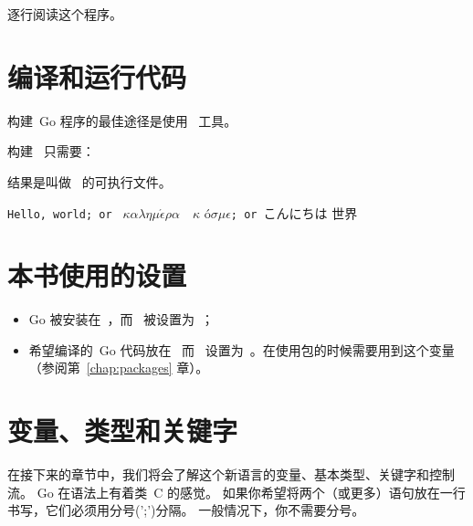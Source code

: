 
逐行阅读这个程序。
\showremarks

\section{编译和运行代码}
\label{sec:building a program}
构建~Go 程序的最佳途径是使用~ 工具。

构建~ 只需要：
\begin{display}
\pr {}
\end{display}
结果是叫做~ 的可执行文件。

\begin{display}
\pr {}
\end{display}
\vspace{-3.0ex}
\texttt{Hello, world; or }%
\begin{math}\kappa\alpha\lambda\eta\mu\acute{\epsilon}\rho\alpha\hspace{1em}\kappa\end{math}%
\'o\begin{math} \sigma\mu\epsilon\end{math}\texttt{; or }こんにちは 世界
\ \newline
\ \newline

\section{本书使用的设置}
\label{sec:settings_used}
\begin{itemize}                            
\item Go 被安装在~，而~ 被设置为~；
\item 希望编译的~Go 代码放在~ 
而~ 设置为~。在使用包的时候需要用到这个变量（参阅第~\ref{chap:packages} 章）。
\end{itemize}

\section{变量、类型和关键字}
\label{sec:vars}
在接下来的章节中，我们将会了解这个新语言的变量、基本类型、关键字和控制流。
Go 在语法上有着类~C 的感觉。
如果你希望将两个（或更多）语句放在一行书写，它们必须用分号(';')分隔。
一般情况下，你不需要分号。

